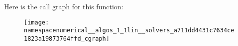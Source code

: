 Here is the call graph for this function\-:\nopagebreak
\begin{figure}[H]
\begin{center}
\leavevmode
\texttt{[image: namespacenumerical\_\_algos\_1\_1lin\_\_solvers\_a711dd4431c7634ce1823a19873764ffd\_cgraph]}
\end{center}
\end{figure}


